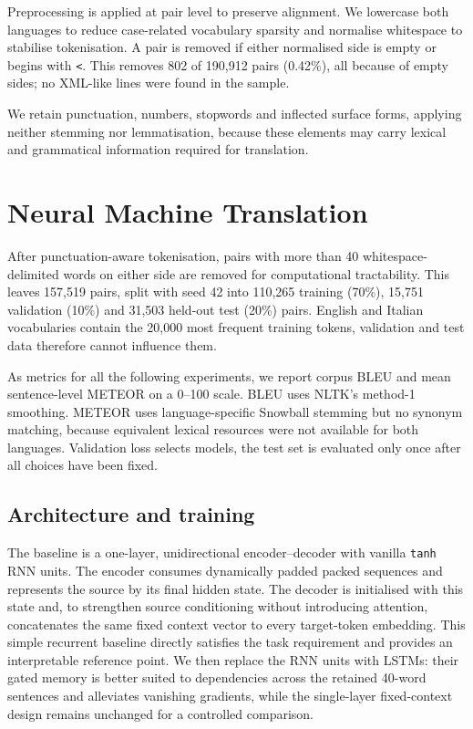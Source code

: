\documentclass[sigconf,nonacm]{acmart}
\begin{document}
Preprocessing is applied at pair level to preserve alignment. We lowercase both languages to reduce case-related vocabulary sparsity and normalise whitespace to stabilise tokenisation. A pair is removed if either normalised side is empty or begins with \texttt{<}. This removes 802 of 190,912 pairs (0.42\%), all because of empty sides; no XML-like lines were found in the sample.

We retain punctuation, numbers, stopwords and inflected surface forms, applying neither stemming nor lemmatisation, because these elements may carry lexical and grammatical information required for translation.

\section{Neural Machine Translation}
\label{sec:nmt}

After punctuation-aware tokenisation, pairs with more than 40
whitespace-delimited words on either side are removed for computational
tractability. This leaves 157,519 pairs, split with seed 42 into 110,265
training (70\%), 15,751 validation (10\%) and 31,503 held-out test (20\%)
pairs. English and Italian vocabularies contain the 20,000 most frequent
training tokens, validation and test data therefore cannot influence them.

As metrics for all the following experiments, we report corpus BLEU and mean sentence-level METEOR on a 0--100 scale. BLEU
uses NLTK's method-1 smoothing. METEOR uses language-specific Snowball stemming
but no synonym matching, because equivalent lexical resources were not
available for both languages. Validation loss selects models, the test set is
evaluated only once after all choices have been fixed.

\subsection{Architecture and training}

The baseline is a one-layer, unidirectional encoder--decoder with vanilla
\texttt{tanh} RNN units. The encoder consumes dynamically padded packed
sequences and represents the source by its final hidden state. The decoder is
initialised with this state and, to strengthen source conditioning without
introducing attention, concatenates the same fixed context vector to every
target-token embedding. This simple recurrent baseline directly satisfies the
task requirement and provides an interpretable reference point. We then replace
the RNN units with LSTMs: their gated memory is better suited to dependencies
across the retained 40-word sentences and alleviates vanishing gradients, while
the single-layer fixed-context design remains unchanged for a controlled
comparison.
\end{document}
